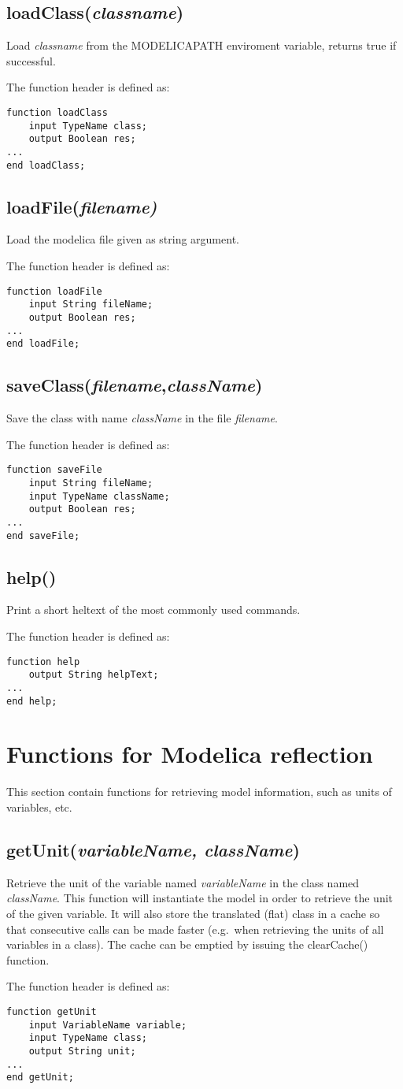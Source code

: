 \documentclass{report}
\newcommand{\func}[1]{\section{#1}}
\newcommand{\funcbegin}{}
\newcommand{\funcend}{}
\begin{document}
\func{loadClass(\emph{classname})}  
Load \emph{classname} from the MODELICAPATH enviroment variable,
returns true if successful.

The function header is defined as:
\begin{verbatim}
function loadClass
    input TypeName class;
    output Boolean res;
...
end loadClass;
\end{verbatim}

\func{loadFile(\emph{filename)}} Load the modelica file given as string argument.

The function header is defined as:
\begin{verbatim}
function loadFile
    input String fileName;
    output Boolean res;
...
end loadFile;
\end{verbatim}

\func{saveClass(\emph{filename},\emph{className})} 
Save the class with name \emph{className} in the file \emph{filename}.

The function header is defined as:
\begin{verbatim}
function saveFile
    input String fileName;
    input TypeName className;
    output Boolean res;
...
end saveFile;
\end{verbatim}
\func{help()} Print a short heltext of the most commonly used
commands.

The function header is defined as:
\begin{verbatim}
function help
    output String helpText;
...
end help;
\end{verbatim}
\funcend

\chapter{Functions for Modelica reflection}
This section contain functions for retrieving model information, such
as units of variables, etc.

\funcbegin

\func{getUnit(\emph{variableName, className})} Retrieve the unit of
the variable named \emph{variableName} in the class named
\emph{className}. This function will instantiate the model in order to
retrieve the unit of the given variable. It will also store the
translated (flat) class in a cache so that consecutive calls can be
made faster (e.g.\ when retrieving the units of all variables in a
class). The cache can be emptied by issuing the clearCache()
function. 

The function header is defined as:
\begin{verbatim}
function getUnit
    input VariableName variable;
    input TypeName class;
    output String unit;
...
end getUnit;
\end{verbatim}
\end{document}
